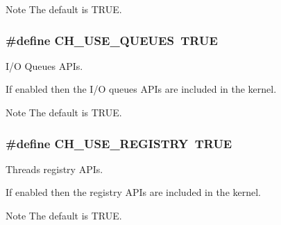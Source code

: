 \begin{DoxyNote}{Note}
The default is {\ttfamily T\+R\+U\+E}. 
\end{DoxyNote}
\hypertarget{group__config_gaabe4bd52d2fd1b180ebba1d1e8243051}{}
\subsubsection[{C\+H\+\_\+\+U\+S\+E\+\_\+\+Q\+U\+E\+U\+E\+S}]{\setlength{\rightskip}{0pt plus 5cm}\#define C\+H\+\_\+\+U\+S\+E\+\_\+\+Q\+U\+E\+U\+E\+S~T\+R\+U\+E}\label{group__config_gaabe4bd52d2fd1b180ebba1d1e8243051}


I/\+O Queues A\+P\+Is. 

If enabled then the I/\+O queues A\+P\+Is are included in the kernel.

\begin{DoxyNote}{Note}
The default is {\ttfamily T\+R\+U\+E}. 
\end{DoxyNote}
\hypertarget{group__config_ga881045654c5c0b04081bf89da3fe4534}{}
\subsubsection[{C\+H\+\_\+\+U\+S\+E\+\_\+\+R\+E\+G\+I\+S\+T\+R\+Y}]{\setlength{\rightskip}{0pt plus 5cm}\#define C\+H\+\_\+\+U\+S\+E\+\_\+\+R\+E\+G\+I\+S\+T\+R\+Y~T\+R\+U\+E}\label{group__config_ga881045654c5c0b04081bf89da3fe4534}


Threads registry A\+P\+Is. 

If enabled then the registry A\+P\+Is are included in the kernel.

\begin{DoxyNote}{Note}
The default is {\ttfamily T\+R\+U\+E}. 
\end{DoxyNote}
\hypertarget{group__config_gab88f410fdc6a67192194a8431d991b27}{}

